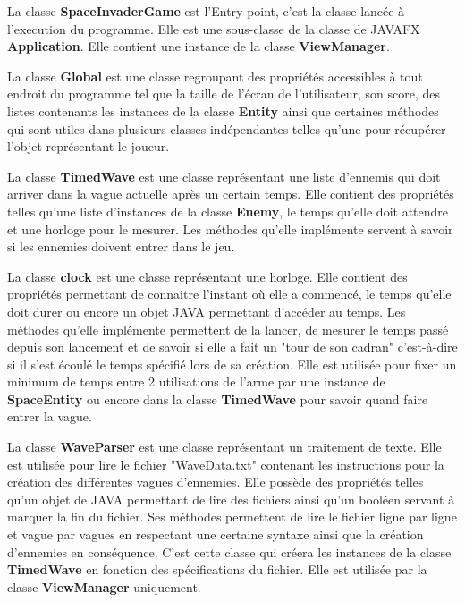 \documentclass[12pt]{article}
\begin{document}
{La classe \textbf{SpaceInvaderGame} est l'Entry point, c'est la classe lancée à l'execution du programme.
Elle est une sous-classe de la classe de JAVAFX \textbf{Application}.
Elle contient une instance de la classe \textbf{ViewManager}.\newline


La classe \textbf{Global} est une classe regroupant des propriétés accessibles à tout endroit du programme tel que la taille de l'écran de l'utilisateur, son score, des listes contenants les instances de la classe \textbf{Entity} ainsi que certaines méthodes qui sont utiles dans plusieurs classes indépendantes telles qu'une pour récupérer l'objet représentant le joueur.\newline \newline \newline \newline 


La classe \textbf{TimedWave} est une classe représentant une liste d'ennemis qui doit arriver dans la vague actuelle après un certain temps. Elle contient des propriétés telles qu'une liste d'instances de la classe \textbf{Enemy}, le temps qu'elle doit attendre et une horloge pour le mesurer. Les méthodes qu'elle implémente servent à savoir si les ennemies doivent entrer dans le jeu.


La classe \textbf{clock} est une classe représentant une horloge. Elle contient des propriétés permettant de connaitre l'instant où elle a commencé, le temps qu'elle doit durer ou encore un objet JAVA permettant d'accéder au temps.
Les méthodes qu'elle implémente permettent de la lancer, de mesurer le temps passé depuis son lancement et de savoir si elle a fait un "tour de son cadran" c’est-à-dire si il s'est écoulé le temps spécifié lors de sa création. Elle est utilisée pour fixer un minimum de temps entre 2 utilisations de l'arme par une instance de \textbf{SpaceEntity} ou encore dans la classe \textbf{TimedWave} pour savoir quand faire entrer la vague. \newline


La classe \textbf{WaveParser} est une classe représentant un traitement de texte. Elle est utilisée pour lire le fichier "WaveData.txt" contenant les instructions pour la création des différentes vagues d'ennemies. Elle possède des propriétés telles qu'un objet de JAVA permettant de lire des fichiers ainsi qu'un booléen servant à marquer la fin du fichier. Ses méthodes permettent de lire le fichier ligne par ligne et vague par vagues en respectant une certaine syntaxe ainsi que la création d'ennemies en conséquence. C'est cette classe qui créera les instances de la classe \textbf{TimedWave} en fonction des spécifications du fichier. Elle est utilisée par la classe \textbf{ViewManager} uniquement.\newline


}
\end{document}
